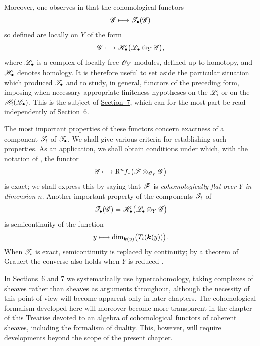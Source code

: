 \begin{env}[6.1.2]
\label{III.6.1.2}
Moreover, one observes in  that the cohomological
functors
\[
  \mathscr{G}\longmapsto\mathscr{T}_\bullet(\mathscr{G})
\]
so defined are locally on $Y$ of the form
\[
  \mathscr{G}\longmapsto
  \mathscr{H}_\bullet\bigl(\mathscr{L}_\bullet\otimes_Y\mathscr{G}\bigr),
\]
where $\mathscr{L}_\bullet$ is a complex of locally free
$\mathscr{O}_Y$-modules, defined up to homotopy, and
$\mathscr{H}_\bullet$ denotes homology.  It is therefore useful to set
aside the particular situation which produced
$\mathscr{T}_\bullet$ and to study, in general,
functors of the preceding form, imposing when necessary appropriate
finiteness hypotheses on the $\mathscr{L}_i$ or on the
$\mathscr{H}_i(\mathscr{L}_\bullet)$.  This is the subject of \hyperref[section:III.7]{Section~7},
which can for the most part be read independently of \hyperref[section:III.6]{Section~6}.

The most important properties of these functors concern exactness
of a component $\mathscr{T}_i$ of $\mathscr{T}_\bullet$.  We shall give
various criteria for establishing such properties.  As an
application, we shall obtain conditions under which, with the
notation of , the functor
\[
  \mathscr{G}\longmapsto
  \mathrm{R}^n f_*\bigl(\mathscr{F}\otimes_{\mathscr{O}_Y}\mathscr{G}\bigr)
\]
is exact; we shall express this by saying that $\mathscr{F}$ is
\emph{cohomologically flat over $Y$ in dimension $n$}.
Another important property of the components $\mathscr{T}_i$ of
\[
  \mathscr{T}_\bullet(\mathscr{G})
  =
  \mathscr{H}_\bullet\bigl(\mathscr{L}_\bullet\otimes_Y\mathscr{G}\bigr)
\]
is semicontinuity of the function
\[
  y\longmapsto
  \dim_{\boldsymbol{k}(y)}\bigl(T_i(\boldsymbol{k}(y))\bigr).
\]
When $\mathscr{T}_i$ is exact, semicontinuity is replaced by continuity;
by a theorem of Grauert the converse also holds when $Y$ is reduced
.
\end{env}

\begin{env}[6.1.3]
\label{III.6.1.3}
In \hyperref[section:III.6]{Sections~6} and \hyperref[section:III.7]{7} we systematically use hypercohomology, taking
complexes of sheaves rather than sheaves as arguments throughout,
although the necessity of this point of view will become apparent
only in later chapters.  The cohomological formalism developed here
will moreover become more transparent in the chapter of this
Treatise devoted to an algebra of cohomological functors of coherent
sheaves, including the formalism of duality.  This, however, will
require developments beyond the scope of the present chapter.
\end{env}


